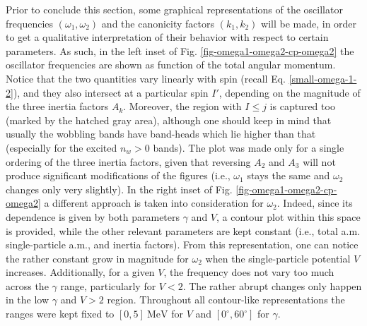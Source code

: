 Prior to conclude this section, some graphical representations of the oscillator frequencies $(\omega_1,\omega_2)$ and the canonicity factors $(k_1,k_2)$ will be made, in order to get a qualitative interpretation of their behavior with respect to certain parameters. As such, in the left inset of Fig. \ref{fig-omega1-omega2-cp-omega2} the oscillator frequencies are shown as function of the total angular momentum. Notice that the two quantities vary linearly with spin (recall Eq. \ref{small-omega-1-2}), and they also intersect at a particular spin $I'$, depending on the magnitude of the three inertia factors $A_k$. Moreover, the region with $I\leq j$ is captured too (marked by the hatched gray area), although one should keep in mind that usually the wobbling bands have band-heads which lie higher than that (especially for the excited $n_w>0$ bands). The plot was made only for a single ordering of the three inertia factors, given that reversing $A_2$ and $A_3$ will not produce significant modifications of the figures (i.e., $\omega_1$ stays the same and $\omega_2$ changes only very slightly). In the right inset of Fig. \ref{fig-omega1-omega2-cp-omega2} a different approach is taken into consideration for $\omega_2$. Indeed, since its dependence is given by both parameters $\gamma$ and $V$, a contour plot within this space is provided, while the other relevant parameters are kept constant (i.e., total a.m. single-particle a.m., and inertia factors). From this representation, one can notice the rather constant grow in magnitude for $\omega_2$ when the single-particle potential $V$ increases. Additionally, for a given $V$, the frequency does not vary too much across the $\gamma$ range, particularly for $V<2$. The rather abrupt changes only happen in the low $\gamma$ and $V>2$ region. Throughout all contour-like representations the ranges were kept fixed to $[0,5]\ \text{MeV}$ for $V$ and $[0^\circ,60^\circ]$ for $\gamma$.
